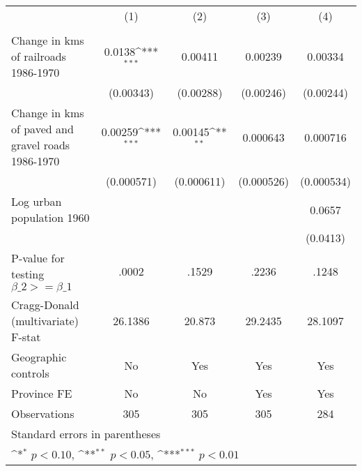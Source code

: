 {
\def\sym#1{\ifmmode^{#1}\else\(^{#1}\)\fi}
\begin{tabular}{l*{4}{c}}
\hline\hline
                &\multicolumn{1}{c}{(1)}&\multicolumn{1}{c}{(2)}&\multicolumn{1}{c}{(3)}&\multicolumn{1}{c}{(4)}\\
                &\multicolumn{1}{c}{}&\multicolumn{1}{c}{}&\multicolumn{1}{c}{}&\multicolumn{1}{c}{}\\
\hline
Change in kms of railroads 1986-1970&   0.0138\sym{***}&  0.00411         &  0.00239         &  0.00334         \\
                &(0.00343)         &(0.00288)         &(0.00246)         &(0.00244)         \\
[1em]
Change in kms of paved and gravel roads 1986-1970&  0.00259\sym{***}&  0.00145\sym{**} & 0.000643         & 0.000716         \\
                &(0.000571)         &(0.000611)         &(0.000526)         &(0.000534)         \\
[1em]
Log urban population 1960&                  &                  &                  &   0.0657         \\
                &                  &                  &                  & (0.0413)         \\
\hline
P-value for testing $\beta\_{2} >= \beta\_{1}$&    .0002         &    .1529         &    .2236         &    .1248         \\
Cragg-Donald (multivariate) F-stat&  26.1386         &   20.873         &  29.2435         &  28.1097         \\
Geographic controls&       No         &      Yes         &      Yes         &      Yes         \\
Province FE     &       No         &       No         &      Yes         &      Yes         \\
Observations    &      305         &      305         &      305         &      284         \\
\hline\hline
\multicolumn{5}{l}{\footnotesize Standard errors in parentheses}\\
\multicolumn{5}{l}{\footnotesize \sym{*} \(p<0.10\), \sym{**} \(p<0.05\), \sym{***} \(p<0.01\)}\\
\end{tabular}
}
